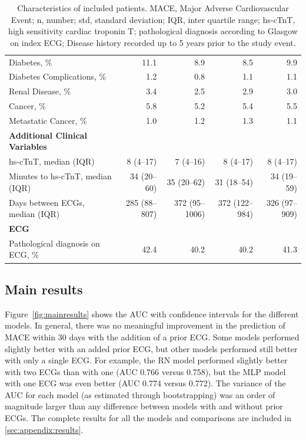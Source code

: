 \documentclass[preprint]{elsarticle}
\begin{document}
\begin{table}
\begin{footnotesize}
\begin{tabular}{@{}lrrrr@{}}
Diabetes, \%                                     & 11.1           & 8.9                 & 8.5           & 9.9            \\
Diabetes Complications, \%                       & 1.2            & 0.8                 & 1.1           & 1.1            \\
Renal Disease, \%                                & 3.4            & 2.5                 & 2.9           & 3.0            \\
Cancer, \%                                       & 5.8            & 5.2                 & 5.4           & 5.5            \\
Metastatic Cancer, \%                            & 1.0            & 1.2                 & 1.3           & 1.1            \\
\midrule
\textbf{Additional Clinical Variables} & & & & \\
\midrule
hs-cTnT, median (IQR)                            & 8 (4--17)       & 7 (4--16)            & 8 (4--17)      & 8 (4--17)       \\
Minutes to hs-cTnT, median (IQR) & 34 (20--60)     & 35 (20--62)          & 31 (18--54)    & 34 (19--59)     \\
Days between ECGs, median (IQR)                  & 285 (88--807)   & 372 (95--1006)       & 372 (122--984) & 326 (97--909)   \\
\midrule
\textbf{ECG} & & & & \\
\midrule
Pathological diagnosis on ECG, \%                & 42.4           & 40.2                & 40.2          & 41.3           \\
\bottomrule
\end{tabular}
\caption{Characteristics of included patients. MACE, Major Adverse Cardiovascular Event; n, number; std, standard deviation; IQR, inter quartile range; hs-cTnT, high sensitivity cardiac troponin T; pathological diagnosis according to Glasgow on index ECG; Disease history recorded up to 5 years prior to the study event.}
\label{table:characteristics}
  \end{footnotesize}
\end{table}
\renewcommand{\arraystretch}{1}

\subsection{Main results}
Figure~\ref{fig:mainresults} shows the AUC with confidence intervals for the different models. In general, there was no meaningful improvement in the prediction of MACE within 30 days with the addition of a prior ECG. Some models performed slightly better with an added prior ECG, but other models performed still better with only a single ECG. For example, the RN model performed slightly better with two ECGs than with one (AUC 0.766 versus 0.758), but the MLP model with one ECG was even better (AUC 0.774 versus 0.772). The variance of the AUC for each model (as estimated through bootstrapping) was an order of magnitude larger than any difference between models with and without prior ECGs. The complete results for all the models and comparisons are included in \ref{sec:appendix:results}. 
\end{document}
